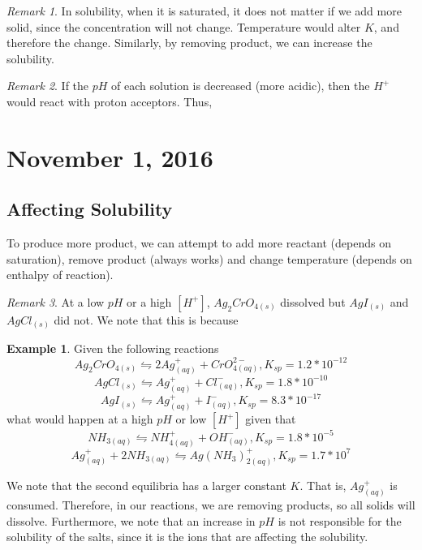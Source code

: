 \documentclass[11pt]{article}
\theoremstyle{plain} %
\theoremstyle{definition}
\theoremstyle{example}
\newtheorem*{example}{Example}
\theoremstyle{remark}
\newtheorem*{remark}{Remark}
\begin{document}
\begin{remark}
In solubility, when it is saturated, it does not matter if we add more solid, since the concentration will not change. Temperature would alter $K$, and therefore the change. Similarly, by removing product, we can increase the solubility. 
\end{remark}

\begin{remark}
If the $pH$ of each solution is decreased (more acidic), then the $H^+$ would react with proton acceptors. Thus, 
\end{remark}

\section{November 1, 2016}
\subsection{Affecting Solubility}

To produce more product, we can attempt to add more reactant (depends on saturation), remove product (always works) and change temperature (depends on enthalpy of reaction). 

\begin{remark}
At a low $pH$ or a high $[H^+]$, $Ag_2CrO_{4(s)}$ dissolved but $AgI_{(s)}$ and $AgCl_{(s)}$ did not. We note that this is because 
\end{remark}

\begin{example}
Given the following reactions 
$$Ag_2CrO_{4(s)} \leftrightharpoons 2Ag_{(aq)}^+ + CrO_{4(aq)}^{2-}, K_{sp} = 1.2*10^{-12}$$
$$AgCl_{(s)} \leftrightharpoons Ag_{(aq)}^+ + Cl_{(aq)}^-, K_{sp}= 1.8*10^{-10}$$
$$AgI_{(s)} \leftrightharpoons Ag_{(aq)}^+ + I_{(aq)}^-, K_{sp} = 8.3*10^{-17}$$
what would happen at a high $pH$ or low $[H^+]$ given that 
$$NH_{3(aq)} \leftrightharpoons NH_{4(aq)}^+ + OH_{(aq)}^-, K_{sp} = 1.8*10^{-5}$$
$$Ag_{(aq)}^+ + 2NH_{3(aq)} \leftrightharpoons Ag(NH_3)_{2(aq)}^+, K_{sp} = 1.7*10^7$$
\end{example}

We note that the second equilibria has a larger constant $K$. That is, $Ag_{(aq)}^+$ is consumed. Therefore, in our reactions, we are removing products, so all solids will dissolve. Furthermore, we note that an increase in $pH$ is not responsible for the solubility of the salts, since it is the ions that are affecting the solubility. 
\end{document}
